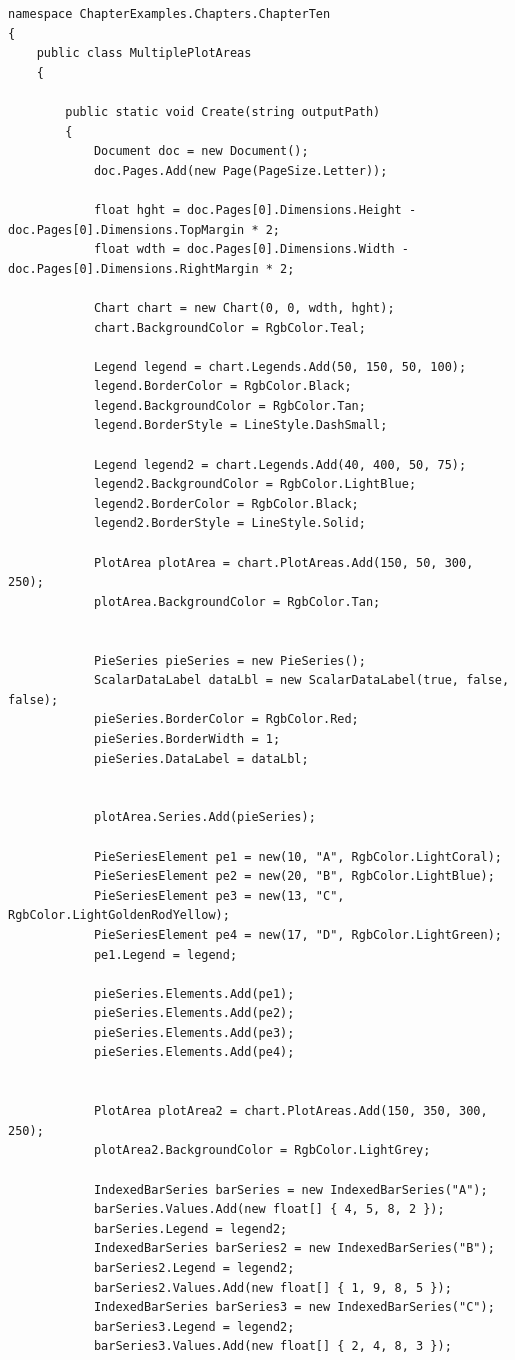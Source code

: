 \documentclass[american]{tufte-book}
\numberwithin{equation}{section}
\numberwithin{figure}{section}
\begin{document}
{\begin{lstlisting}[caption={A chart with two plot areas.},label={lis:two-plot-A-chart-with},basicstyle={\footnotesize\ttfamily},breaklines=true]
namespace ChapterExamples.Chapters.ChapterTen
{
    public class MultiplePlotAreas
    {

        public static void Create(string outputPath)
        {
            Document doc = new Document();
            doc.Pages.Add(new Page(PageSize.Letter));

            float hght = doc.Pages[0].Dimensions.Height - doc.Pages[0].Dimensions.TopMargin * 2;
            float wdth = doc.Pages[0].Dimensions.Width - doc.Pages[0].Dimensions.RightMargin * 2;

            Chart chart = new Chart(0, 0, wdth, hght);
            chart.BackgroundColor = RgbColor.Teal;

            Legend legend = chart.Legends.Add(50, 150, 50, 100);
            legend.BorderColor = RgbColor.Black;
            legend.BackgroundColor = RgbColor.Tan;
            legend.BorderStyle = LineStyle.DashSmall;

            Legend legend2 = chart.Legends.Add(40, 400, 50, 75);
            legend2.BackgroundColor = RgbColor.LightBlue;
            legend2.BorderColor = RgbColor.Black;
            legend2.BorderStyle = LineStyle.Solid;

            PlotArea plotArea = chart.PlotAreas.Add(150, 50, 300, 250);
            plotArea.BackgroundColor = RgbColor.Tan;


            PieSeries pieSeries = new PieSeries();
            ScalarDataLabel dataLbl = new ScalarDataLabel(true, false, false);
            pieSeries.BorderColor = RgbColor.Red;
            pieSeries.BorderWidth = 1;
            pieSeries.DataLabel = dataLbl;


            plotArea.Series.Add(pieSeries);

            PieSeriesElement pe1 = new(10, "A", RgbColor.LightCoral);
            PieSeriesElement pe2 = new(20, "B", RgbColor.LightBlue);
            PieSeriesElement pe3 = new(13, "C", RgbColor.LightGoldenRodYellow);
            PieSeriesElement pe4 = new(17, "D", RgbColor.LightGreen);
            pe1.Legend = legend;

            pieSeries.Elements.Add(pe1);
            pieSeries.Elements.Add(pe2);
            pieSeries.Elements.Add(pe3);
            pieSeries.Elements.Add(pe4);


            PlotArea plotArea2 = chart.PlotAreas.Add(150, 350, 300, 250);
            plotArea2.BackgroundColor = RgbColor.LightGrey;

            IndexedBarSeries barSeries = new IndexedBarSeries("A");
            barSeries.Values.Add(new float[] { 4, 5, 8, 2 });
            barSeries.Legend = legend2;
            IndexedBarSeries barSeries2 = new IndexedBarSeries("B");
            barSeries2.Legend = legend2;
            barSeries2.Values.Add(new float[] { 1, 9, 8, 5 });
            IndexedBarSeries barSeries3 = new IndexedBarSeries("C");
            barSeries3.Legend = legend2;
            barSeries3.Values.Add(new float[] { 2, 4, 8, 3 });


\end{lstlisting}}
\end{document}
